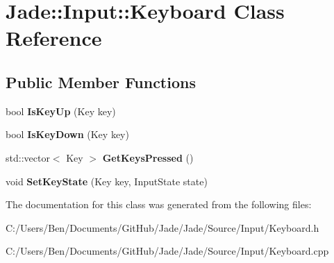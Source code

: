 \hypertarget{class_jade_1_1_input_1_1_keyboard}{}\section{Jade\+:\+:Input\+:\+:Keyboard Class Reference}
\label{class_jade_1_1_input_1_1_keyboard}
\subsection*{Public Member Functions}
\begin{DoxyCompactItemize}
\item 
\hypertarget{class_jade_1_1_input_1_1_keyboard_abaf81f9db47f2b5e4e3a571330b24e93}{}bool {\bfseries Is\+Key\+Up} (Key key)\label{class_jade_1_1_input_1_1_keyboard_abaf81f9db47f2b5e4e3a571330b24e93}

\item 
\hypertarget{class_jade_1_1_input_1_1_keyboard_a65572b44109b1567626f2cc205059ba8}{}bool {\bfseries Is\+Key\+Down} (Key key)\label{class_jade_1_1_input_1_1_keyboard_a65572b44109b1567626f2cc205059ba8}

\item 
\hypertarget{class_jade_1_1_input_1_1_keyboard_a01b1e08a3c7bd4c7a7de7e4022625caa}{}std\+::vector$<$ Key $>$ {\bfseries Get\+Keys\+Pressed} ()\label{class_jade_1_1_input_1_1_keyboard_a01b1e08a3c7bd4c7a7de7e4022625caa}

\item 
\hypertarget{class_jade_1_1_input_1_1_keyboard_af036a724df0841b08ef85ab304afe6b3}{}void {\bfseries Set\+Key\+State} (Key key, Input\+State state)\label{class_jade_1_1_input_1_1_keyboard_af036a724df0841b08ef85ab304afe6b3}

\end{DoxyCompactItemize}


The documentation for this class was generated from the following files\+:\begin{DoxyCompactItemize}
\item 
C\+:/\+Users/\+Ben/\+Documents/\+Git\+Hub/\+Jade/\+Jade/\+Source/\+Input/Keyboard.\+h\item 
C\+:/\+Users/\+Ben/\+Documents/\+Git\+Hub/\+Jade/\+Jade/\+Source/\+Input/Keyboard.\+cpp\end{DoxyCompactItemize}
